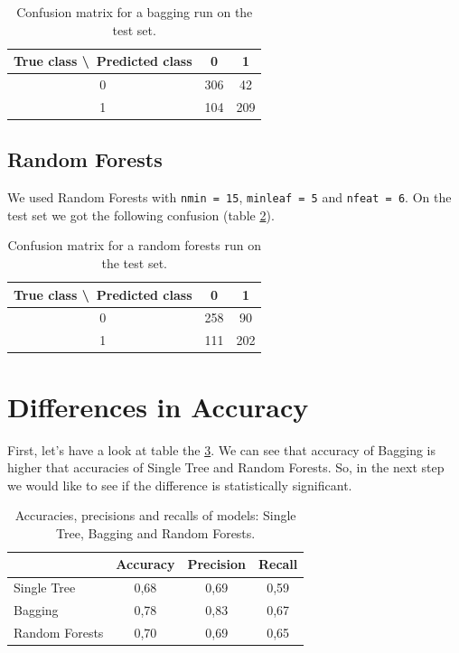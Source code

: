 \documentclass[a4paper,11pt]{article}
\begin{document}
\begin{table}[h!]
\centering
	\begin{tabular}{c||c|c}
	True class \textbackslash\ Predicted class & 0 & 1 \\ \hline \hline
	0 & 306 & 42 \\ \hline
	1 & 104 & 209
	\end{tabular}
	\caption{Confusion matrix for a bagging run on the test set.}
	\label{tab: bagging}
\end{table}



\subsection{Random Forests}
We used Random Forests with \verb|nmin = 15|, \verb|minleaf = 5| and  \verb|nfeat = 6|. On the test set we got the following confusion (table \ref{tab: randomforest}).

\begin{table}[h!]
\centering
	\begin{tabular}{c||c|c}
	True class \textbackslash\ Predicted class & 0 & 1 \\ \hline \hline
	0 & 258 & 90 \\ \hline
	1 & 111 & 202
	\end{tabular}
	\caption{Confusion matrix for a random forests run on the test set.}
	\label{tab: randomforest}
\end{table}



\section{Differences in Accuracy}
First, let's have a look at table the \ref{tab: apr}. We can see that accuracy of Bagging is higher that accuracies of Single Tree and Random Forests. So, in the next step we would like to see if the difference is statistically significant.

\begin{table}[h!]
\centering
	\begin{tabular}{l||c|c|c}
	& Accuracy & Precision & Recall \\ \hline \hline
	Single Tree & 0{,}68 & 0{,}69 & 0{,}59 \\ \hline
	Bagging & 0{,}78 & 0{,}83 & 0{,}67 \\ \hline
	Random Forests & 0{,}70 & 0{,}69 & 0{,}65 
	\end{tabular}
	\caption{Accuracies, precisions and recalls of models: Single Tree, Bagging and Random Forests.}
	\label{tab: apr}
\end{table}
\end{document}
